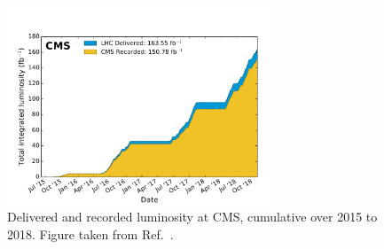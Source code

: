 \begin{figure}
  \centering
  \includegraphics[width=0.7\textwidth]{Figures/Detector/LHC/lumi.pdf}
  \caption[Delivered and Recorded Luminosity at CMS, Cumulative Over 2015 to 2018]{Delivered and recorded luminosity at CMS, cumulative over 2015 to 2018. Figure taken from Ref.~\cite{LumiPubl64:online}.}\label{fig:lumi}
\end{figure}